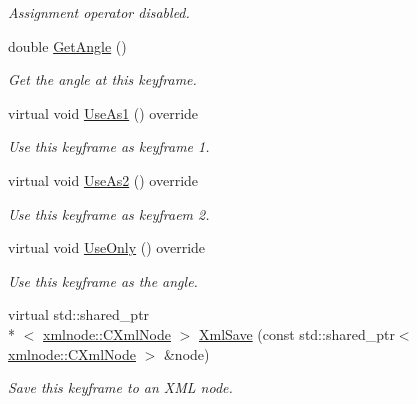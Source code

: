 \begin{DoxyCompactItemize}
\begin{DoxyCompactList}\small\item\em Assignment operator disabled. \end{DoxyCompactList}\item 
double \hyperlink{class_c_anim_channel_angle_1_1_keyframe_angle_a2bcfb0054c78424b3eb4a4b9950d9b9c}{Get\+Angle} ()
\begin{DoxyCompactList}\small\item\em Get the angle at this keyframe. \end{DoxyCompactList}\item 
\hypertarget{class_c_anim_channel_angle_1_1_keyframe_angle_a539433fabd4f3ca88cdac75e087571f7}{virtual void \hyperlink{class_c_anim_channel_angle_1_1_keyframe_angle_a539433fabd4f3ca88cdac75e087571f7}{Use\+As1} () override}\label{class_c_anim_channel_angle_1_1_keyframe_angle_a539433fabd4f3ca88cdac75e087571f7}

\begin{DoxyCompactList}\small\item\em Use this keyframe as keyframe 1. \end{DoxyCompactList}\item 
\hypertarget{class_c_anim_channel_angle_1_1_keyframe_angle_ac11ffb0bf6bb63c4f8bc61f5cfbc90fe}{virtual void \hyperlink{class_c_anim_channel_angle_1_1_keyframe_angle_ac11ffb0bf6bb63c4f8bc61f5cfbc90fe}{Use\+As2} () override}\label{class_c_anim_channel_angle_1_1_keyframe_angle_ac11ffb0bf6bb63c4f8bc61f5cfbc90fe}

\begin{DoxyCompactList}\small\item\em Use this keyframe as keyfraem 2. \end{DoxyCompactList}\item 
\hypertarget{class_c_anim_channel_angle_1_1_keyframe_angle_a75483355e52ab73210c4b6a26d3494b1}{virtual void \hyperlink{class_c_anim_channel_angle_1_1_keyframe_angle_a75483355e52ab73210c4b6a26d3494b1}{Use\+Only} () override}\label{class_c_anim_channel_angle_1_1_keyframe_angle_a75483355e52ab73210c4b6a26d3494b1}

\begin{DoxyCompactList}\small\item\em Use this keyframe as the angle. \end{DoxyCompactList}\item 
virtual std\+::shared\+\_\+ptr\\*
$<$ \hyperlink{classxmlnode_1_1_c_xml_node}{xmlnode\+::\+C\+Xml\+Node} $>$ \hyperlink{class_c_anim_channel_angle_1_1_keyframe_angle_af5d88921f81522bfa70fab8d2a49904b}{Xml\+Save} (const std\+::shared\+\_\+ptr$<$ \hyperlink{classxmlnode_1_1_c_xml_node}{xmlnode\+::\+C\+Xml\+Node} $>$ \&node)
\begin{DoxyCompactList}\small\item\em Save this keyframe to an X\+M\+L node. \end{DoxyCompactList}\end{DoxyCompactItemize}


